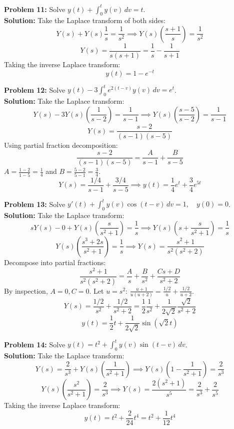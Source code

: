 \documentclass[11pt, letterpaper]{article}
\theoremstyle{definition}
\theoremstyle{remark}
\begin{document}
\textbf{Problem 11:} Solve $y(t) + \int_0^t y(v) \, dv = t$.
\vspace{0.5em}\\
\textbf{Solution:}
Take the Laplace transform of both sides:
\[ Y(s) + Y(s)\frac{1}{s} = \frac{1}{s^2} \implies Y(s)\left(\frac{s+1}{s}\right) = \frac{1}{s^2} \]
\[ Y(s) = \frac{1}{s(s+1)} = \frac{1}{s} - \frac{1}{s+1} \]
Taking the inverse Laplace transform:
\[ y(t) = 1 - e^{-t} \]

\textbf{Problem 12:} Solve $y(t) - 3 \int_0^t e^{2(t-v)}y(v) \, dv = e^t$.
\vspace{0.5em}\\
\textbf{Solution:}
Take the Laplace transform:
\[ Y(s) - 3Y(s)\left(\frac{1}{s-2}\right) = \frac{1}{s-1} \implies Y(s)\left(\frac{s-5}{s-2}\right) = \frac{1}{s-1} \]
\[ Y(s) = \frac{s-2}{(s-1)(s-5)} \]
Using partial fraction decomposition:
\[ \frac{s-2}{(s-1)(s-5)} = \frac{A}{s-1} + \frac{B}{s-5} \]
$A = \frac{1-2}{1-5} = \frac{1}{4}$ and $B = \frac{5-2}{5-1} = \frac{3}{4}$.
\[ Y(s) = \frac{1/4}{s-1} + \frac{3/4}{s-5} \implies y(t) = \frac{1}{4}e^t + \frac{3}{4}e^{5t} \]

\textbf{Problem 13:} Solve $y'(t) + \int_0^t y(v)\cos(t-v) \, dv = 1, \quad y(0) = 0$.
\vspace{0.5em}\\
\textbf{Solution:}
Take the Laplace transform:
\[ sY(s) - 0 + Y(s)\left(\frac{s}{s^2+1}\right) = \frac{1}{s} \implies Y(s)\left(s + \frac{s}{s^2+1}\right) = \frac{1}{s} \]
\[ Y(s)\left(\frac{s^3+2s}{s^2+1}\right) = \frac{1}{s} \implies Y(s) = \frac{s^2+1}{s^2(s^2+2)} \]
Decompose into partial fractions:
\[ \frac{s^2+1}{s^2(s^2+2)} = \frac{A}{s} + \frac{B}{s^2} + \frac{Cs+D}{s^2+2} \]
By inspection, $A=0, C=0$. Let $u = s^2$: $\frac{u+1}{u(u+2)} = \frac{1/2}{u} + \frac{1/2}{u+2}$.
\[ Y(s) = \frac{1/2}{s^2} + \frac{1/2}{s^2+2} = \frac{1}{2}\frac{1}{s^2} + \frac{1}{2\sqrt{2}}\frac{\sqrt{2}}{s^2+2} \]
\[ y(t) = \frac{1}{2}t + \frac{1}{2\sqrt{2}}\sin(\sqrt{2}t) \]

\textbf{Problem 14:} Solve $y(t) = t^2 + \int_0^t y(v)\sin(t-v) \, dv$.
\vspace{0.5em}\\
\textbf{Solution:}
Take the Laplace transform:
\[ Y(s) = \frac{2}{s^3} + Y(s)\left(\frac{1}{s^2+1}\right) \implies Y(s)\left(1 - \frac{1}{s^2+1}\right) = \frac{2}{s^3} \]
\[ Y(s)\left(\frac{s^2}{s^2+1}\right) = \frac{2}{s^3} \implies Y(s) = \frac{2(s^2+1)}{s^5} = \frac{2}{s^3} + \frac{2}{s^5} \]
Taking the inverse Laplace transform:
\[ y(t) = t^2 + \frac{2}{24}t^4 = t^2 + \frac{1}{12}t^4 \]
\end{document}
